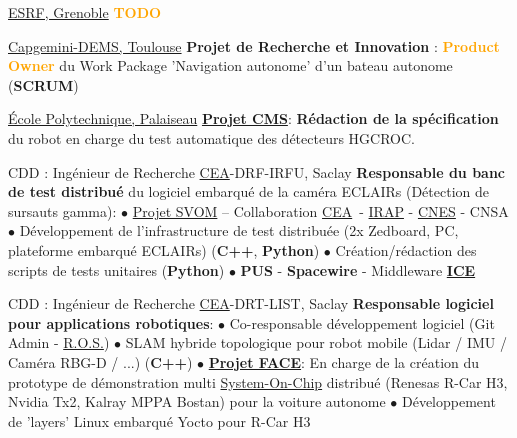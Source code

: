 \documentclass[
	a4paper,
	subsectioncolor=cvblue!70,
]{fortysecondscv}
\newcommand{\cea}{\href{http://www.cea.fr/}{CEA}}
\newcommand{\ros}{\href{http://www.ros.org/}{R.O.S.}}
\newcommand{\hl}[1]{\textbf{\textcolor{orange}{#1}}}
\begin{document}
\begin{cvtable}[2]
  {\href{https://www.esrf.fr/}{ESRF, Grenoble}}
  {
    \hl{TODO}
  }

  {\href{https://www.capgemini.com/service/digital-services/digital-engineering-and-manufacturing-services/}{Capgemini-DEMS, Toulouse}}
  {
    \textbf{Projet de Recherche et Innovation} : \hl{Product Owner} du Work Package
    'Navigation autonome' d'un bateau autonome (\textbf{SCRUM})
  }

  {\href{https://www.polytechnique.edu/fr/le-laboratoire-leprince-ringuet-llr}{École Polytechnique, Palaiseau}}
  {
    \textbf{\href{http://polywww.in2p3.fr/-cms-45-?lang=fr}{Projet CMS}}:
    \textbf{Rédaction de la spécification} du robot en charge du test
    automatique des détecteurs HGCROC.
  }

  {CDD : Ingénieur de Recherche}
  {\cea-DRF-IRFU, Saclay}
  {
    \textbf{Responsable du banc de test distribué} du logiciel embarqué de la
    caméra ECLAIRs (Détection de sursauts gamma):\newline
    $\bullet$ \href{http://www.svom.fr/}{Projet SVOM} -- Collaboration \cea\
    - \href{http://www.irap.omp.eu/}{IRAP} - \href{https://cnes.fr/fr}{CNES} - CNSA\newline
    $\bullet$ Développement de l'infrastructure de test distribuée (2x Zedboard, PC,
    plateforme embarqué ECLAIRs) (\textbf{C++}, \textbf{Python})\newline
    $\bullet$ Création/rédaction des scripts de tests unitaires
    (\textbf{Python})\newline
    $\bullet$ \textbf{PUS} - \textbf{Spacewire} - Middleware
    \href{https://zeroc.com/products/ice}{\textbf{ICE}}
  }

  {CDD : Ingénieur de Recherche}
  {\cea-DRT-LIST, Saclay}
  {
    \textbf{Responsable logiciel pour applications robotiques}:\newline
    $\bullet$ Co-responsable développement logiciel (Git Admin - \ros)\newline
    $\bullet$ SLAM hybride topologique pour robot mobile (Lidar / IMU / Caméra RBG-D
    / ...) (\textbf{C++})\newline
    $\bullet$ \textbf{\href{https://www.designspot.fr/portfolio/face/}{Projet
        FACE}}: En charge de la création du prototype de démonstration multi
    \href{https://en.wikipedia.org/wiki/System_on_a_chip}{System-On-Chip}
    distribué (Renesas R-Car H3, Nvidia Tx2, Kalray MPPA Bostan) pour la voiture
    autonome\newline
    $\bullet$ Développement de 'layers' Linux embarqué Yocto pour R-Car H3
  }


\end{cvtable}
\end{document}
